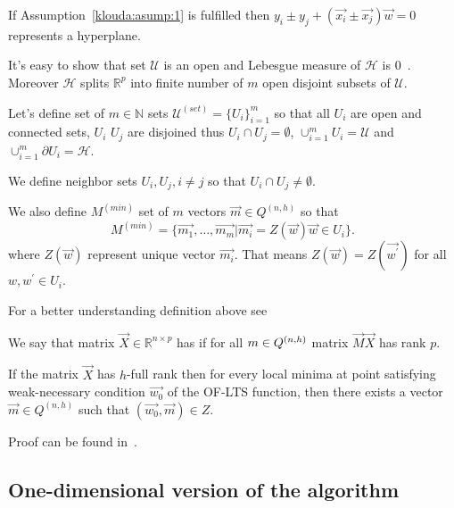 If Assumption~\ref{klouda:asump:1} is fulfilled then $ y_i \pm y_j + (\vec{x_i} \pm \vec{x_j})  \vec{w} = 0$ represents a hyperplane. 

It's easy to show that set $\mathcal{U}$ is an open and Lebesgue measure of $\mathcal{H}$  is $0$~\cite{klouda2015exact}. Moreover $\mathcal{H}$ splits $\mathbb{R}^{p}$ into finite number of $m$ open disjoint subsets of $\mathcal{U}$. 

\begin{definition}
    Let's define set of $m \in \mathbb{N}$ sets $\mathcal{U}^{(set)} = \{{ U_i\}}_{i=1}^{m}$ so that
    all $U_i$ are open and connected sets, $U_i$ $U_j$ are disjoined thus $U_i \cap  U_j = \emptyset$, $\cup_{i=1}^{m}    U_i = \mathcal{U}$ and $\cup_{i=1}^{m}    \partial U_i =  \mathcal{H}$.

    We define neighbor sets $U_i, U_j, i \neq j$ so that $ U_i \cap U_j \neq \emptyset$. 

    We also define $M^{(min)}$ set of $m$ vectors $\vec{m} \in Q^{(n,h)}$ so that 
    \begin{equation*}
        M^{(min)} = \{{ \vec{m_1}, \ldots, \vec{m_m} | \vec{m_i} = Z(\vec{w}) \vec{w} \in U_i  \}}.
    \end{equation*}
    where $Z(\vec{w})$ represent unique vector $\vec{m_i}$. That means $Z(\vec{w}) = Z(\vec{w^{\prime}})$ for all $w, w^{\prime} \in U_i$.
\end{definition}

For a better understanding definition above see 


We say that matrix $\vec{X} \in \mathbb{R}^{n \times p}$ has  if for all $m \in Q^{(n,h)}$ matrix $\vec{M}\vec{X}$ has rank $p$.

\begin{theorem} \label{minimas:in:relation}
    If the matrix $\vec{X}$ has $h$-full rank then for every local minima at point satisfying weak-necessary condition $\vec{w_{0}}$ of the OF-LTS function, then there exists a vector $\vec{m} \in Q^{(n,h)}$ such that $(\vec{w_{0}}, \vec{m}) \in Z$.
\end{theorem}

Proof can be found in~\cite[Theorem~7]{klouda2015exact}. 

\subsection{ One-dimensional version of the algorithm}


